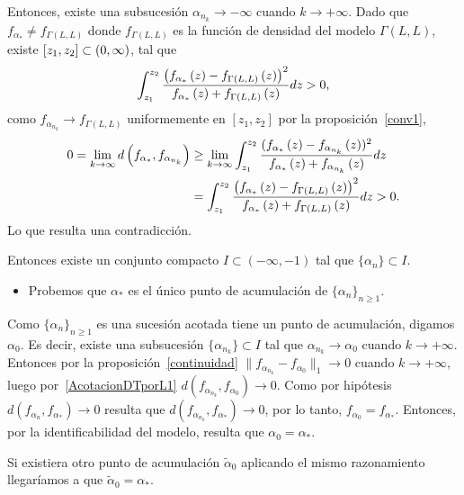 \begin{dem}
\begin{itemize}
\begin{enumerate}[(i)]
			Entonces, existe una subsucesión $\alpha_{n_{k}} \to -\infty$ cuando $k \to +\infty$. Dado que $f_{\alpha_{*}}\ne f_{\Gamma(L,L)}$ donde $f_{\Gamma(L,L)}$ es la función de densidad del modelo $\Gamma(L,L)$, existe $[z_{1},z_{2}]\subset\left( 0,\infty \right)$, tal que
			\begin{align*}
			\int_{z_{1}}^{z_{2}}\frac{\left( f_{\alpha_{*}}\left( z \right)-f_{\Gamma(L,L)}\left( z \right) \right)^{2}}
			{f_{\alpha_{*}}\left( z \right)+f_{\Gamma(L,L)}\left( z \right)}dz >0,
			\end{align*}
			como $f_{\alpha_{n_{k}}} \to f_{\Gamma(L,L)}$ uniformemente en $[z_{1},z_{2}]$ por la proposición~\ref{conv1}, 
			\begin{align*}
			0=\lim_{k\to\infty} d\left( f_{\alpha_{*}}, f_{\alpha_{n_{k}}} \right) 
			& \ge \lim_{k\to\infty}  \int_{z_{1}}^{z_{2}}\frac{(f_{\alpha_{*}}\left( z \right)-f_{\alpha_{n_{k}}}\left( z \right))^{2}}
			{f_{\alpha_{*}}\left( z \right) + f_{\alpha_{n_{k}}}\left( z \right)}dz \\
			& = \int_{z_{1}}^{z_{2}}\frac{\left( f_{\alpha_{*}}\left( z \right)-f_{\Gamma(L,L)}\left( z \right) \right)^{2}}
			{f_{\alpha_{*}}\left( z \right)+f_{\Gamma(L,L)}\left( z \right)}dz >0.
			\end{align*}
			Lo que resulta una contradicción.
		\end{enumerate}
		Entonces existe un conjunto compacto $I \subset (-\infty,-1)$ tal que $\{\alpha_{n}\} \subset I$.
	\end{itemize}
	
	\begin{itemize}
		\item Probemos que $\alpha_*$ es el único punto de acumulación de $\{\alpha_{n}\}_{n \ge 1}$.
	\end{itemize}
	
	Como $\{\alpha_{n}\}_{n \ge 1}$ es una sucesión acotada tiene un punto de acumulación, digamos $\alpha_0$. Es decir, existe una subsucesión $\{\alpha_{n_{k}}\} \subset I$ tal que $\alpha_{n_{k}} \to \alpha_{0}$ cuando $k \to +\infty$. Entonces por la proposición~\ref{continuidad} $\| f_{\alpha_{n_{k}}} - f_{\alpha_{0}}\|_{1} \to 0$ cuando $k \to +\infty$, luego por~\eqref{AcotacionDTporL1} $d(f_{\alpha_{n_k}},f_{\alpha_0}) \to 0$. Como por hipótesis $d(f_{\alpha_{n}},f_{\alpha_*}) \to 0$ resulta que $d(f_{\alpha_{n_k}},f_{\alpha_*}) \to 0$, por lo tanto, $f_{\alpha_0} = f_{\alpha_*}$. Entonces, por la identificabilidad del modelo, resulta que $\alpha_0=\alpha_*$.
	
	Si existiera otro punto de acumulación $\tilde{\alpha}_0$ aplicando el mismo razonamiento llegaríamos a que $\tilde{\alpha}_0=\alpha_*$.
	

\end{dem}
